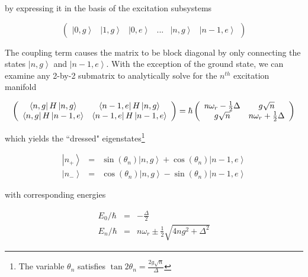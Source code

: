 \documentclass[12 pt]{book}
\newcommand{\ket}[1]{\left| #1 \right>} %
\newcommand{\matrixel}[3]{\left< #1 \vphantom{#2#3} \right|
 #2 \left| #3 \vphantom{#1#2} \right>} %
\begin{document}
by expressing it in the basis of the excitation subsystems

\begin{equation}
\left(\begin{array}{cccccc} \ket{0,g} & \ket{1,g} & \ket{0,e} & ... & \ket{n, g} & \ket{n-1,e}
\end{array}\right)
\end{equation}

The coupling term causes the matrix to be block diagonal by only connecting the states $\ket{n,g}$ and $\ket{n-1,e}$. With the exception of the ground state, we can examine any 2-by-2 submatrix to analytically solve for the $n^{th}$ excitation manifold

\begin{equation}
\left(\begin{array}{cc}
\matrixel{n,g}{H}{n,g} & \matrixel{n-1,e}{H}{n,g} \\
\matrixel{n,g}{H}{n-1,e} & \matrixel{n-1,e}{H}{n-1,e}
\end{array}\right) = \hbar \left(\begin{array}{cc}
n\omega_r-\frac{1}{2}\Delta 	& g\sqrt{n} \\
 g\sqrt{n}					& n\omega_r+\frac{1}{2}\Delta
\end{array}\right)
\end{equation}

which yields the ``dressed" eigenstates\footnote{The variable $\theta_n$ satisfies $\tan{2\theta_n}=\frac{2g\sqrt{n}}{\Delta}$} 

\begin{eqnarray}
\ket{n_+} &=& \sin(\theta_n)\ket{n,g}+\cos(\theta_n)\ket{n-1,e} \\
\ket{n_-} &=& \cos(\theta_n)\ket{n,g}-\sin(\theta_n)\ket{n-1,e}
\end{eqnarray}

with corresponding energies

\begin{eqnarray}
E_0/\hbar &=& -\frac{\Delta}{2} \\
E_n/\hbar &=& n\omega_r \pm \frac{1}{2}\sqrt{4ng^2+\Delta^2} \nonumber
\end{eqnarray}

\end{document}
